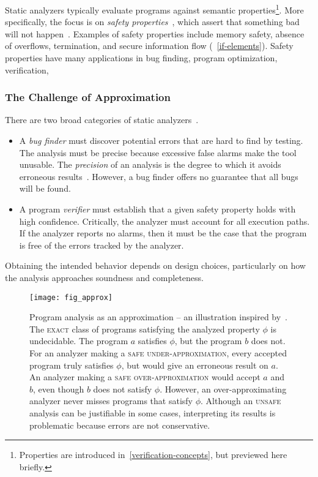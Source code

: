 Static analyzers typically evaluate programs against semantic properties\footnote{
Properties are introduced in~\autoref{verification-concepts}, but previewed here briefly.}.
More specifically, the focus is on \emph{safety properties}~\cite[p. 6]{moller2023},
which assert that something bad will not happen~\cite{lamport1977}.
Examples of safety properties include memory safety, absence of overflows, termination, and secure information flow (\cf~\autoref{if-elements}).
Safety properties have many applications in bug finding, program optimization, verification, \etc

\subsubsection{The Challenge of Approximation}\label{static-approx}

There are two broad categories of static analyzers~\cite{jourdan2015}.

\begin{itemize}

\item A \emph{bug finder} must discover potential errors that are hard to find by testing.
The analysis must be precise because excessive false alarms make the tool unusable.
The \emph{precision} of an analysis is the degree to which it avoids erroneous results~\cite{livshits2015}.
However, a bug finder offers no guarantee that all bugs will be found.

\item A program \emph{verifier} must establish that a given safety property holds with high confidence.
Critically, the analyzer must account for all execution paths.
If the analyzer reports no alarms, then it must be the case that the program is free of the errors tracked by the analyzer.

\end{itemize}

Obtaining the intended behavior depends on design choices, particularly on how the analysis approaches soundness and completeness.

\begin{figure}[t]
\centering
\texttt{[image: fig\_approx]}
\caption[Program analysis as an approximation.]{
Program analysis as an approximation -- an illustration inspired by~\textcite{steffen2020}.
The \textsc{exact} class of programs satisfying the analyzed property \(\phi\) is undecidable.
The program \(a\) satisfies \(\phi\), but the program \(b\) does not.
For an analyzer making a \textsc{safe under-approximation}, every accepted program truly satisfies \(\phi\), but would give an erroneous result on \(a\).
An analyzer making a \textsc{safe over-approximation} would accept \(a\) and \(b\), even though \(b\) does not satisfy \(\phi\).
However, an over-approximating analyzer never misses programs that satisfy \(\phi\).
Although an \textsc{unsafe} analysis can be justifiable in some cases,
interpreting its results is problematic because errors are not conservative.
}\label{fig:approx}
\end{figure}

